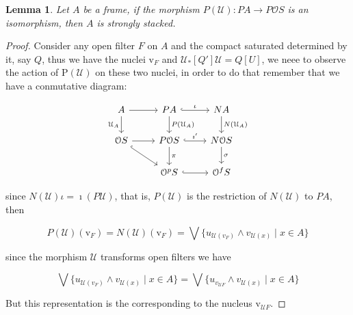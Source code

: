 \documentclass[11pt]{amsart}
\theoremstyle{plain}
\newtheorem{lem}[thm]{Lemma}
\theoremstyle{definition}
\begin{document}

\begin{lem}\label{patchiso}
Let $A$ be a frame, if the morphism $P(\mathcal{U})\colon PA\rightarrow P\mathcal{O}S$ 
is an isomorphism, then $A$ is strongly stacked.

\end{lem}


\begin{proof}
Consider any open filter $F$ on $A$ and the compact saturated determined by it, say $Q$, 
thus we have the nuclei $\mathrm{v}_{F}$ and $\mathcal{U}_{*}[Q']\mathcal{U}=Q[U]$, we neee to observe the action of 
$\mathrm{P}(\mathcal{U})$ on these two nuclei, in order to do that remember that we have a conmutative diagram:

\[\begin{tikzcd}
	A & PA & NA \\
	{\mathcal{O}S} & {P\mathcal{O}S} & {N\mathcal{O}S} \\
	& {\mathcal{O}^pS} & {\mathcal{O}^fS}
	\arrow[from=1-1, to=1-2]
	\arrow["{\mathcal{U}_A}"', from=1-1, to=2-1]
	\arrow["\iota",hook, from=1-2, to=1-3]
	\arrow["{P(\mathcal{U}_A)}", from=1-2, to=2-2]
	\arrow["{N(\mathcal{U}_A)}", from=1-3, to=2-3]
	\arrow[from=2-1, to=2-2]
	\arrow[hook, from=2-1, to=3-2]
	\arrow["\imath '",hook, from=2-2, to=2-3]
	\arrow["\pi", from=2-2, to=3-2]
	\arrow["\sigma", from=2-3, to=3-3]
	\arrow[hook, from=3-2, to=3-3]
\end{tikzcd}\]

since $N(\mathcal{U})\iota=\imath (P\mathcal{U})$, that is, $P(\mathcal{U})$ 
is the restriction of $N(\mathcal{U})$ to $PA$, then 

\[P(\mathcal{U})(\mathrm{v}_{F})=N(\mathcal{U})(\mathrm{v}_{F})=\bigvee\{u_{\mathcal{U}(v_{F})}\wedge v_{\mathcal{U}(x)}\mid x\in A \}\]

since the morphism $\mathcal{U}$ transforms open filters we have 



\[\bigvee\{u_{\mathcal{U}(v_{F})}\wedge v_{\mathcal{U}(x)}\mid x\in A \}=\bigvee\{u_{v_{\mathcal{U}F}}\wedge v_{\mathcal{U}(x)}\mid x\in A \}\]


But this representation is the corresponding to the nucleus $\mathrm{v}_{\mathcal{U}F}$.
\end{proof}
\end{document}

